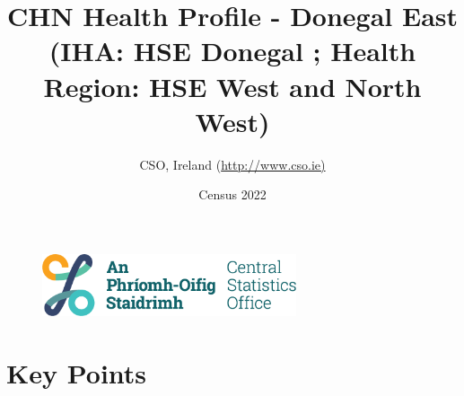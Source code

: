 \documentclass{article}
\title{CHN Health Profile - Donegal East (IHA: HSE Donegal ;  Health Region: HSE West and North West) }
\date{Census 2022}
\author{CSO, Ireland  (\url{http://www.cso.ie)}}
\begin{document}


\begin{figure}
	\centering
\includegraphics[width =75mm]{../figures/CSO_Logo.png}
\end{figure}

				 
		   
						  
														  
																																													
												 
			 
\maketitle
					
													   
				 
						 
																																																																											   
				 
				  
  \pagebreak
    	    \tableofcontents

\pagebreak


\section{Key Points}
\end{document}

